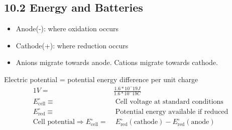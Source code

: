 \subsection{10.2 Energy and Batteries}
    \begin{itemize}
        \item Anode(-): where oxidation occurs
        \item Cathode(+): where reduction occurs
        \item Anions migrate towards anode. Cations migrate towards cathode.
    \end{itemize}

    Electric potential = potential energy difference per unit charge
    \begin{align*}
        1V =& \frac{1.6*10^-19 J}{1.6*10^-19 C}\\
        E^\circ_\text{cell} \equiv& \; \text{Cell voltage at standard conditions}\\
        E^\circ_\text{red} \equiv& \; \text{Potential energy available if reduced}\\
        \text{Cell potential} \Rightarrow E^\circ_\text{cell} =& \; E^\circ_\text{red}(\text{cathode}) - E^\circ_\text{red}(\text{anode})
    \end{align*}